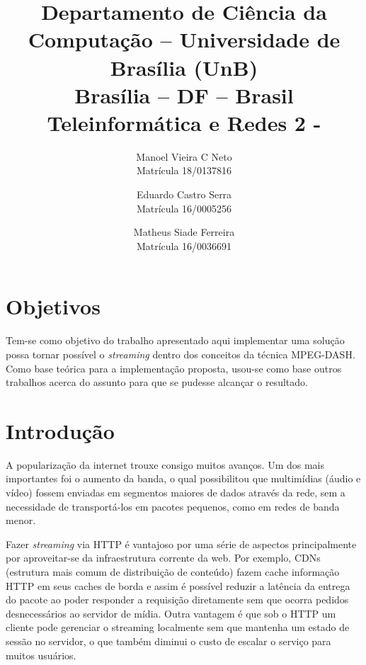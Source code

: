 \documentclass[10pt,twocolumn,letterpaper]{article}
\begin{document}
	
	\title{Departamento de Ciência da Computação -- Universidade de Brasília (UnB)\\
		Brasília -- DF -- Brasil\\
		Teleinformática e Redes 2 - \\
	}
	
	\author{
		Manoel Vieira C Neto\\ 
		Matrícula 18/0137816\\
		\and
		
		Eduardo Castro Serra\\ 
		Matrícula 16/0005256\\
		\and
		
		Matheus Siade Ferreira\\ 
		Matrícula 16/0036691\\
		\and
	}

\maketitle
	
	\section{Objetivos}
	Tem-se como objetivo do trabalho apresentado aqui implementar uma solução possa tornar possível o \textit{streaming} dentro dos conceitos da técnica MPEG-DASH. Como base teórica para a implementação proposta, usou-se como base outros trabalhos acerca do assunto para que se pudesse alcançar o resultado\cite{li2014probe}. 
	\section{Introdução}
	A popularização da internet trouxe consigo muitos avanços. Um dos mais importantes foi o aumento da banda, o qual possibilitou que multimídias (áudio e vídeo) fossem enviadas em segmentos maiores de dados através da rede, sem a necessidade de transportá-los em pacotes pequenos, como em redes de banda menor.
	
	Fazer \textit{streaming} via HTTP é vantajoso por uma série de aspectos principalmente por aproveitar-se da infraestrutura corrente da web\cite{niamut2016mpeg}. Por exemplo, CDNs (estrutura mais comum de distribuição de conteúdo) fazem cache informação HTTP em seus caches de borda e assim é possível reduzir a latência da entrega do pacote ao poder responder a requisição diretamente sem que ocorra pedidos desnecessários ao servidor de mídia. Outra vantagem é que sob o HTTP um cliente pode gerenciar o streaming localmente sem que mantenha um estado de sessão no servidor, o que também diminui o custo de escalar o serviço para muitos usuários.
	
\end{document}
